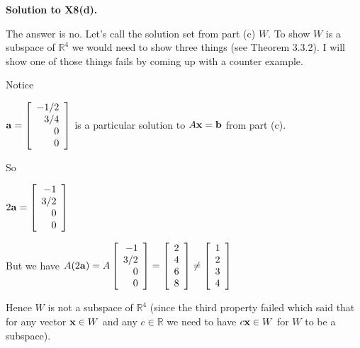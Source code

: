 \documentclass[10pt]{exam}
\begin{document}
{\bf Solution to {\bf X8}(d).}

The answer is no.  Let's call the solution set from part (c) $W$.  To show $W$ is a subspace of $\mathbb{R}^4$ we would need to show three things (see Theorem 3.3.2).  I will show one of those things fails by coming up with a counter example.

Notice

${\bf a}= \left[ \begin{array}{r} -1/2\\3/4\\0\\0  \end{array} \right]$ is a particular solution to $A{\bf x}={\bf b}$ from part (c).  

So

$2{\bf a}= \left[ \begin{array}{r} -1\\3/2\\0\\0  \end{array} \right]$

But we have $A(2{\bf a})=A \left[ \begin{array}{r} -1\\3/2\\0\\0  \end{array} \right] = \left[ \begin{array}{r} 2\\4\\6\\8  \end{array} \right] \neq \left[ \begin{array}{r} 1\\2\\3\\4  \end{array} \right]$

Hence $W$ is not a subspace of $\mathbb{R}^4$ (since the third property failed which said that for any vector ${\bf x}\in W$ and any $c\in \mathbb{R}$ we need to have $c{\bf x} \in W$ for $W$ to be a subspace).
\end{document}
